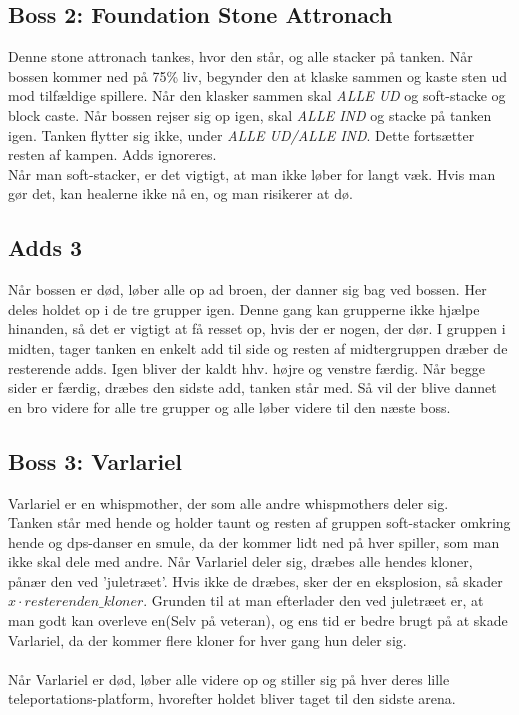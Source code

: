 \subsection*{Boss 2: Foundation Stone Attronach}
Denne stone attronach tankes, hvor den står, og alle stacker på tanken. Når
bossen kommer ned på 75\% liv, begynder den at klaske sammen og kaste sten ud
mod tilfældige spillere. Når den klasker sammen skal \emph{ALLE UD} og
soft-stacke og block caste. Når bossen rejser sig op igen, skal \emph{ALLE IND}
og stacke på tanken igen. Tanken flytter sig ikke, under \emph{ALLE UD/ALLE
IND}. Dette fortsætter resten af kampen. Adds ignoreres.\\
Når man soft-stacker, er det vigtigt, at man ikke løber for langt væk. Hvis man
gør det, kan healerne ikke nå en, og man risikerer at dø. 
\subsection*{Adds 3}
Når bossen er død, løber alle op ad broen, der danner sig bag ved bossen. Her
deles holdet op i de tre grupper igen. Denne gang kan grupperne ikke hjælpe
hinanden, så det er vigtigt at få resset op, hvis der er nogen, der dør.
I gruppen i midten, tager tanken en enkelt add til side og resten af
midtergruppen dræber de resterende adds.
Igen bliver der kaldt hhv. højre og venstre færdig. Når begge sider er færdig,
dræbes den sidste add, tanken står med. Så vil der blive dannet en bro videre
for alle tre grupper og alle løber videre til den næste boss.
\subsection*{Boss 3: Varlariel}
Varlariel er en whispmother, der som alle andre whispmothers deler sig.\\
Tanken står med hende og holder taunt og resten af gruppen soft-stacker omkring
hende og dps-danser en smule, da der kommer lidt ned på hver spiller, som man
ikke skal dele med andre.
Når Varlariel deler sig, dræbes alle hendes kloner, pånær den ved 'juletræet'.
Hvis ikke de dræbes, sker der en eksplosion, så skader $x \cdot
resterenden\_kloner$. Grunden til at man efterlader den ved juletræet er, at
man godt kan overleve en(Selv på veteran), og ens tid er bedre brugt på at
skade Varlariel, da der kommer flere kloner for hver gang hun deler sig.\\
\\
Når Varlariel er død, løber alle videre op og stiller sig på hver deres lille
teleportations-platform, hvorefter holdet bliver taget til den sidste arena.
